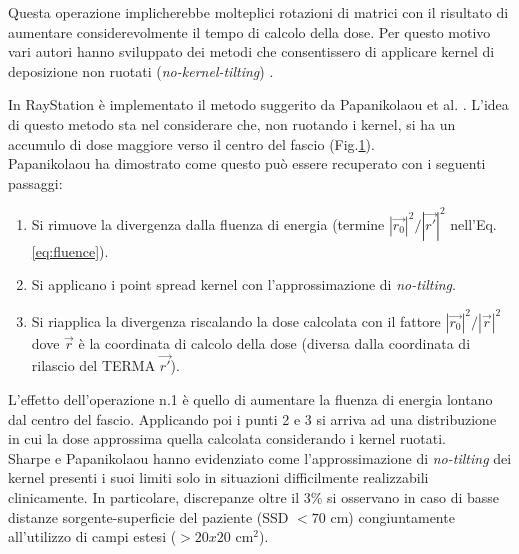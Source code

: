 {\begin{figure}
\label{fig:kern_tilt}
\end{figure}
Questa operazione implicherebbe molteplici rotazioni di matrici \cite{Sharpe1997} con il risultato di aumentare considerevolmente il tempo di calcolo della dose. 
Per questo motivo vari autori hanno sviluppato dei metodi che consentissero di applicare kernel di deposizione non ruotati (\textit{no-kernel-tilting}) \cite{Sharpe1997,Papanikolaou1993}.

In RayStation è implementato il metodo suggerito da Papanikolaou et al. \cite{Papanikolaou1993}. L'idea di questo metodo sta nel considerare che, non ruotando i kernel, si ha un accumulo di dose maggiore verso il centro del fascio (Fig.\ref{fig:kern_tilt}).\\ 
Papanikolaou ha dimostrato come questo può essere recuperato con i seguenti passaggi:
\begin{enumerate}
\item Si rimuove la divergenza dalla fluenza di energia (termine $|\vec{r_0}|^2/|\vec{r'}|^2$ nell'Eq.\eqref{eq:fluence}).
\item Si applicano i point spread kernel con l'approssimazione di \textit{no-tilting}.
\item Si riapplica la divergenza riscalando la dose calcolata con il fattore $|\vec{r_0}|^2/|\vec{r}|^2$ dove $\vec{r}$ è la coordinata di calcolo della dose (diversa dalla coordinata di rilascio del TERMA $\vec{r'}$).
\end{enumerate}
L'effetto dell'operazione n.1 è quello di aumentare la fluenza di energia lontano dal centro del fascio. Applicando poi i punti 2 e 3 si arriva ad una distribuzione in cui la dose approssima quella calcolata considerando i kernel ruotati.\\
Sharpe e Papanikolaou \cite{Sharpe1997,Papanikolaou1993} hanno evidenziato come l'approssimazione di \textit{no-tilting} dei kernel presenti i suoi limiti solo in situazioni difficilmente realizzabili clinicamente. In particolare, discrepanze oltre il 3\% si osservano in caso di basse distanze sorgente-superficie del paziente (SSD $< 70$ cm) congiuntamente all'utilizzo di campi estesi ($> 20x20$ cm$^2$).



}
